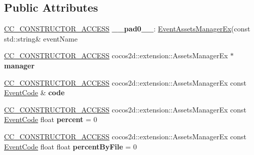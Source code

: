 \subsection*{Public Attributes}
\begin{DoxyCompactItemize}
\item 
\mbox{\label{classEventAssetsManagerEx_a5abd7b71fcdb442e4b2f69fbe4ce93c0}} 
\hyperlink{_2cocos2d_2cocos_2base_2ccConfig_8h_a25ef1314f97c35a2ed3d029b0ead6da0}{C\+C\+\_\+\+C\+O\+N\+S\+T\+R\+U\+C\+T\+O\+R\+\_\+\+A\+C\+C\+E\+SS} {\bfseries \+\_\+\+\_\+pad0\+\_\+\+\_\+}\+: \hyperlink{classEventAssetsManagerEx}{Event\+Assets\+Manager\+Ex}(const std\+::string\& event\+Name
\item 
\mbox{\label{classEventAssetsManagerEx_ab4620da523435f47e0126eda8d05850e}} 
\hyperlink{_2cocos2d_2cocos_2base_2ccConfig_8h_a25ef1314f97c35a2ed3d029b0ead6da0}{C\+C\+\_\+\+C\+O\+N\+S\+T\+R\+U\+C\+T\+O\+R\+\_\+\+A\+C\+C\+E\+SS} cocos2d\+::extension\+::\+Assets\+Manager\+Ex $\ast$ {\bfseries manager}
\item 
\mbox{\label{classEventAssetsManagerEx_a53b5701f26e23d2d494b6ff1b73899c7}} 
\hyperlink{_2cocos2d_2cocos_2base_2ccConfig_8h_a25ef1314f97c35a2ed3d029b0ead6da0}{C\+C\+\_\+\+C\+O\+N\+S\+T\+R\+U\+C\+T\+O\+R\+\_\+\+A\+C\+C\+E\+SS} cocos2d\+::extension\+::\+Assets\+Manager\+Ex const \hyperlink{classEventAssetsManagerEx_ae48992cd906169f84a146e7ae8851cae}{Event\+Code} \& {\bfseries code}
\item 
\mbox{\label{classEventAssetsManagerEx_a54a62fb05ce941c49e3c15fada104c4b}} 
\hyperlink{_2cocos2d_2cocos_2base_2ccConfig_8h_a25ef1314f97c35a2ed3d029b0ead6da0}{C\+C\+\_\+\+C\+O\+N\+S\+T\+R\+U\+C\+T\+O\+R\+\_\+\+A\+C\+C\+E\+SS} cocos2d\+::extension\+::\+Assets\+Manager\+Ex const \hyperlink{classEventAssetsManagerEx_ae48992cd906169f84a146e7ae8851cae}{Event\+Code} float {\bfseries percent} = 0
\item 
\mbox{\label{classEventAssetsManagerEx_a3b2809ae5a542ac6442c5d2d9e8b6437}} 
\hyperlink{_2cocos2d_2cocos_2base_2ccConfig_8h_a25ef1314f97c35a2ed3d029b0ead6da0}{C\+C\+\_\+\+C\+O\+N\+S\+T\+R\+U\+C\+T\+O\+R\+\_\+\+A\+C\+C\+E\+SS} cocos2d\+::extension\+::\+Assets\+Manager\+Ex const \hyperlink{classEventAssetsManagerEx_ae48992cd906169f84a146e7ae8851cae}{Event\+Code} float float {\bfseries percent\+By\+File} = 0

\end{DoxyCompactItemize}
